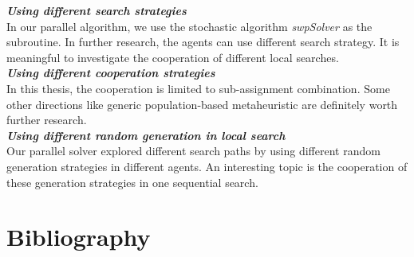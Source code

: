 \documentclass[12pt,a4paper,twoside]{scrartcl}
\numberwithin{equation}{section}
\begin{document}
\emph{\textbf{Using different  search strategies}}\\
In our parallel algorithm, we use the stochastic algorithm \emph{swpSolver} as the subroutine. In further research, the agents can use different search strategy. It is meaningful to investigate the cooperation of different local searches.\\

\emph{\textbf{Using different cooperation strategies}}\\
In this thesis, the cooperation is limited to sub-assignment combination. Some other directions like generic population-based metaheuristic are definitely worth further research.\\

\emph{\textbf{Using different random generation in local search}}\\
Our parallel solver explored different search paths by using different random generation strategies in different agents. An interesting topic is the cooperation of these generation strategies in one sequential search.
\clearpage
\section{Bibliography}


\end{document}
